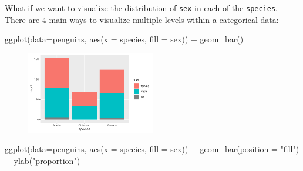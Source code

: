 \documentclass[
  letterpaper,
  DIV=11,
  numbers=noendperiod]{scrreprt}
\newenvironment{Shaded}{\begin{snugshade}}{\end{snugshade}}
\newcommand{\AttributeTok}[1]{\textcolor[rgb]{0.40,0.45,0.13}{#1}}
\newcommand{\FunctionTok}[1]{\textcolor[rgb]{0.28,0.35,0.67}{#1}}
\newcommand{\NormalTok}[1]{\textcolor[rgb]{0.00,0.23,0.31}{#1}}
\newcommand{\SpecialCharTok}[1]{\textcolor[rgb]{0.37,0.37,0.37}{#1}}
\newcommand{\StringTok}[1]{\textcolor[rgb]{0.13,0.47,0.30}{#1}}
\begin{document}
\begin{tcolorbox}[enhanced jigsaw, breakable, colback=white, bottomrule=.15mm, leftrule=.75mm, colframe=quarto-callout-note-color-frame, arc=.35mm, rightrule=.15mm, toprule=.15mm, left=2mm, opacityback=0]

What if we want to visualize the distribution of \texttt{sex} in each of
the \texttt{species}. There are 4 main ways to visualize multiple levels
within a categorical data:

\begin{Shaded}
\begin{Highlighting}[]
\FunctionTok{ggplot}\NormalTok{(}\AttributeTok{data=}\NormalTok{penguins, }\FunctionTok{aes}\NormalTok{(}\AttributeTok{x =}\NormalTok{ species, }\AttributeTok{fill =}\NormalTok{ sex)) }\SpecialCharTok{+}
  \FunctionTok{geom\_bar}\NormalTok{()}
\end{Highlighting}
\end{Shaded}

\begin{figure}[H]

{\centering \includegraphics[width=0.5\textwidth,height=\textheight]{05-content_files/figure-pdf/cat-barplot-1.pdf}

}

\end{figure}

\begin{Shaded}
\begin{Highlighting}[]
\FunctionTok{ggplot}\NormalTok{(}\AttributeTok{data=}\NormalTok{penguins, }\FunctionTok{aes}\NormalTok{(}\AttributeTok{x =}\NormalTok{ species, }\AttributeTok{fill =}\NormalTok{ sex)) }\SpecialCharTok{+}
  \FunctionTok{geom\_bar}\NormalTok{(}\AttributeTok{position =} \StringTok{"fill"}\NormalTok{) }\SpecialCharTok{+}
  \FunctionTok{ylab}\NormalTok{(}\StringTok{"proportion"}\NormalTok{)}
\end{Highlighting}
\end{Shaded}

\begin{figure}[H]


\end{figure}
\end{tcolorbox}
\end{document}
